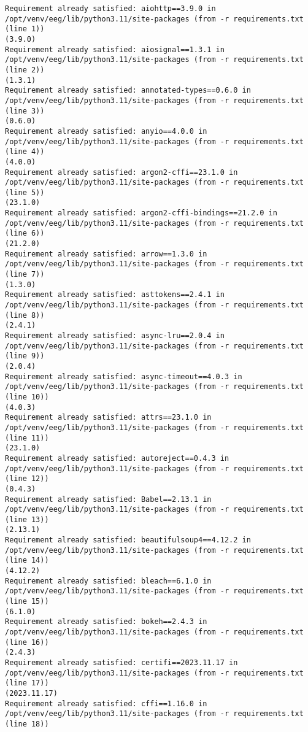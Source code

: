 \documentclass[11pt]{article}
\begin{document}
    \begin{Verbatim}[commandchars=\\\{\}]
Requirement already satisfied: aiohttp==3.9.0 in
/opt/venv/eeg/lib/python3.11/site-packages (from -r requirements.txt (line 1))
(3.9.0)
Requirement already satisfied: aiosignal==1.3.1 in
/opt/venv/eeg/lib/python3.11/site-packages (from -r requirements.txt (line 2))
(1.3.1)
Requirement already satisfied: annotated-types==0.6.0 in
/opt/venv/eeg/lib/python3.11/site-packages (from -r requirements.txt (line 3))
(0.6.0)
Requirement already satisfied: anyio==4.0.0 in
/opt/venv/eeg/lib/python3.11/site-packages (from -r requirements.txt (line 4))
(4.0.0)
Requirement already satisfied: argon2-cffi==23.1.0 in
/opt/venv/eeg/lib/python3.11/site-packages (from -r requirements.txt (line 5))
(23.1.0)
Requirement already satisfied: argon2-cffi-bindings==21.2.0 in
/opt/venv/eeg/lib/python3.11/site-packages (from -r requirements.txt (line 6))
(21.2.0)
Requirement already satisfied: arrow==1.3.0 in
/opt/venv/eeg/lib/python3.11/site-packages (from -r requirements.txt (line 7))
(1.3.0)
Requirement already satisfied: asttokens==2.4.1 in
/opt/venv/eeg/lib/python3.11/site-packages (from -r requirements.txt (line 8))
(2.4.1)
Requirement already satisfied: async-lru==2.0.4 in
/opt/venv/eeg/lib/python3.11/site-packages (from -r requirements.txt (line 9))
(2.0.4)
Requirement already satisfied: async-timeout==4.0.3 in
/opt/venv/eeg/lib/python3.11/site-packages (from -r requirements.txt (line 10))
(4.0.3)
Requirement already satisfied: attrs==23.1.0 in
/opt/venv/eeg/lib/python3.11/site-packages (from -r requirements.txt (line 11))
(23.1.0)
Requirement already satisfied: autoreject==0.4.3 in
/opt/venv/eeg/lib/python3.11/site-packages (from -r requirements.txt (line 12))
(0.4.3)
Requirement already satisfied: Babel==2.13.1 in
/opt/venv/eeg/lib/python3.11/site-packages (from -r requirements.txt (line 13))
(2.13.1)
Requirement already satisfied: beautifulsoup4==4.12.2 in
/opt/venv/eeg/lib/python3.11/site-packages (from -r requirements.txt (line 14))
(4.12.2)
Requirement already satisfied: bleach==6.1.0 in
/opt/venv/eeg/lib/python3.11/site-packages (from -r requirements.txt (line 15))
(6.1.0)
Requirement already satisfied: bokeh==2.4.3 in
/opt/venv/eeg/lib/python3.11/site-packages (from -r requirements.txt (line 16))
(2.4.3)
Requirement already satisfied: certifi==2023.11.17 in
/opt/venv/eeg/lib/python3.11/site-packages (from -r requirements.txt (line 17))
(2023.11.17)
Requirement already satisfied: cffi==1.16.0 in
/opt/venv/eeg/lib/python3.11/site-packages (from -r requirements.txt (line 18))

\end{Verbatim}
\end{document}
